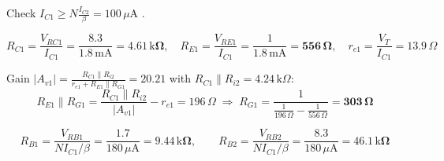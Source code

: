 \documentclass[11pt]{article}
\begin{document}
Check $I_{C1} \ge N\frac{I_{C2}}{\beta} = 100\,\mu \mathrm{A}$ \checkmark. 

\[R_{C1} = \frac{V_{RC1}}{I_{C1}} = \frac{8.3}{1.8\,\mathrm{m}\mathrm{A}} = \mathbf{4.61\,\mathrm{k}\Omega},\quad R_{E1} = \frac{V_{RE1}}{I_{C1}} = \frac{1}{1.8\,\mathrm{m}\mathrm{A}} = \mathbf{556\,\Omega},\quad r_{e1} = \frac{V_T}{I_{C1}} = 13.9\,\Omega\]

Gain $|A_{v1}| = \frac{R_{C1}\|R_{i2}}{r_{e1} + R_{E1}\|R_{G1}} = 20.21$ with $R_{C1}\|R_{i2} = 4.24\,\mathrm{k}\Omega$:\[R_{E1}\|R_{G1} = \frac{R_{C1}\|R_{i2}}{|A_{v1}|} - r_{e1} = 196\,\Omega \;\Rightarrow\; R_{G1} = \frac{1}{\frac{1}{196\,\Omega} - \frac{1}{556\,\Omega}} = \mathbf{303\,\Omega}\]

\[R_{B1} = \frac{V_{RB1}}{N I_{C1}/\beta} = \frac{1.7}{180\,\mu \mathrm{A}} = \mathbf{9.44\,\mathrm{k}\Omega},\qquad R_{B2} = \frac{V_{RB2}}{N I_{C1}/\beta} = \frac{8.3}{180\,\mu \mathrm{A}} = \mathbf{46.1\,\mathrm{k}\Omega}\]
\end{document}
